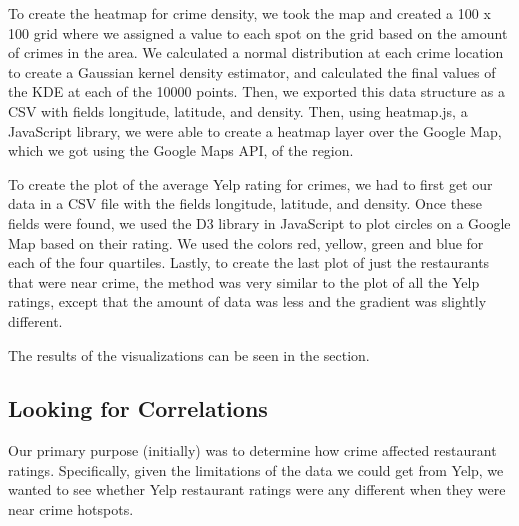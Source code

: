 \documentclass{article}
\begin{document}
To create the heatmap for crime density, we took the map and created a 100
x 100 grid where we assigned a value to each spot on the grid based on the
amount of crimes in the area. We calculated a normal distribution at each
crime location to create a Gaussian kernel density estimator, and
calculated the final values of the KDE at each of the 10000 points. Then,
we exported this data structure as a CSV with fields longitude, latitude,
and density. Then, using heatmap.js, a JavaScript library, we were able to
create a heatmap layer over the Google Map, which we got using the Google
Maps API, of the region.

To create the plot of the average Yelp rating for crimes, we had to first
get our data in a CSV file with the fields longitude, latitude, and
density. Once these fields were found, we used the D3 library in JavaScript
to plot circles on a Google Map based on their rating. We used the colors
red, yellow, green and blue for each of the four quartiles. Lastly, to
create the last plot of just the restaurants that were near crime, the
method was very similar to the plot of all the Yelp ratings, except that
the amount of data was less and the gradient was slightly different.

The results of the visualizations can be seen in the
\textbf{} section.

\subsection{Looking for Correlations}

Our primary purpose (initially) was to determine how crime affected
restaurant ratings. Specifically, given the limitations of the data we
could get from Yelp, we wanted to see whether Yelp restaurant ratings were
any different when they were near crime hotspots.
\end{document}
